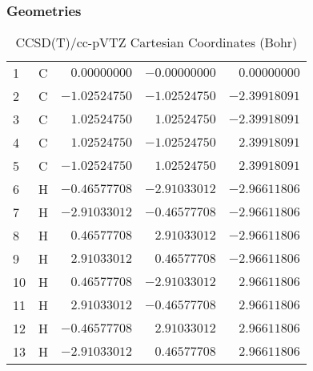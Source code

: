 \documentclass[10pt,oneside]{article}
\begin{document}
\subsubsection*{Geometries}
\begin{table}[h!]
\centering
\caption{CCSD(T)/cc-pVTZ Cartesian Coordinates (Bohr)}
\begin{tabular}{llrrr}
1  & C  & $ 0.00000000$ & $-0.00000000$ & $ 0.00000000$ \\
2  & C  & $-1.02524750$ & $-1.02524750$ & $-2.39918091$ \\
3  & C  & $ 1.02524750$ & $ 1.02524750$ & $-2.39918091$ \\
4  & C  & $ 1.02524750$ & $-1.02524750$ & $ 2.39918091$ \\
5  & C  & $-1.02524750$ & $ 1.02524750$ & $ 2.39918091$ \\
6  & H  & $-0.46577708$ & $-2.91033012$ & $-2.96611806$ \\
7  & H  & $-2.91033012$ & $-0.46577708$ & $-2.96611806$ \\
8  & H  & $ 0.46577708$ & $ 2.91033012$ & $-2.96611806$ \\
9  & H  & $ 2.91033012$ & $ 0.46577708$ & $-2.96611806$ \\
10 & H  & $ 0.46577708$ & $-2.91033012$ & $ 2.96611806$ \\
11 & H  & $ 2.91033012$ & $-0.46577708$ & $ 2.96611806$ \\
12 & H  & $-0.46577708$ & $ 2.91033012$ & $ 2.96611806$ \\
13 & H  & $-2.91033012$ & $ 0.46577708$ & $ 2.96611806$ \\
\end{tabular}
\end{table}
\end{document}
